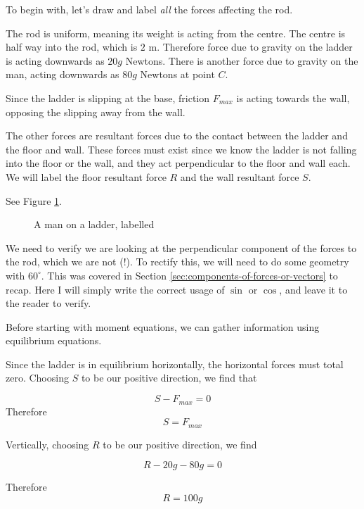 \begin{solution}

    To begin with, let's draw and label \emph{all} the forces affecting the rod. 

    The rod is uniform, meaning its weight is acting from the centre. The centre is half way into the rod, which is $2$ m. Therefore force due to gravity on the ladder is acting downwards 
    as $20g$ Newtons. There is another force due to gravity on the man, acting downwards as $80g$ Newtons at point $C$.

    Since the ladder is slipping at the base, friction $F_{max}$ is acting towards the wall, opposing the slipping away from the wall.

    The other forces are resultant forces due to the contact between the ladder and the floor and wall. These forces must exist since we know the ladder is not 
    falling into the floor or the wall, and they act perpendicular to the floor and wall each. We will label the floor resultant force $R$ and the wall resultant force $S$.

    See Figure \ref{fig:man_on_ladder_labelled}.

    \begin{figure}[H]
    \centering
    \caption{A man on a ladder, labelled}
    \label{fig:man_on_ladder_labelled}
    \end{figure}

    We need to verify we are looking at the perpendicular component of the forces to the rod, which we are not (!). To rectify this, we will need to do some geometry with $60^\circ$. 
    This was covered in Section \ref{sec:components-of-forces-or-vectors} to recap. Here I will simply write the correct usage of $\sin$ or $\cos$, and leave it to the reader to verify.

    Before starting with moment equations, we can gather information using equilibrium equations.

    Since the ladder is in equilibrium horizontally, the horizontal forces must total zero. Choosing $S$ to be our positive direction, we find that 

    \[S-F_{max} = 0\]
    Therefore
    \[S = F_{max}\]

    Vertically, choosing $R$ to be our positive direction, we find 

    \[ R - 20g - 80g = 0\]

    Therefore
    \[R = 100g\]


\end{solution}

